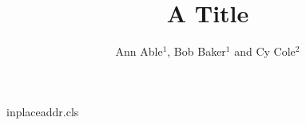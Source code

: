 \begin{filecontents*}[overwrite]{inplaceaddr.cls}
\newenvironment{indented}{\begin{list}{}{\leftmargin=2em\itemsep=0pt}}{\end{list}}
\renewcommand{\title}[1]{\begin{indented}\item[]\Large #1\end{indented}}
\renewcommand{\author}[1]{\begin{indented}\item[]\normalsize\bfseries #1\end{indented}}
\newcommand{\address}[1]{\begin{indented}\item[]\normalsize #1\end{indented}}
\def\email#1{\vspace*{5pt}\address{E-mail: #1}}
\end{filecontents*}
\documentclass{inplaceaddr}

\title{A Title}
\author{Ann Able$^1$, Bob Baker$^1$ and Cy Cole$^2$}
\address{$^1$ Univ A, Town, Country}
\address{$^2$ Univ B, City, Country}
\begin{abstract}
Abstract text.
\end{abstract}
\section{Intro}
Write to the desk:


